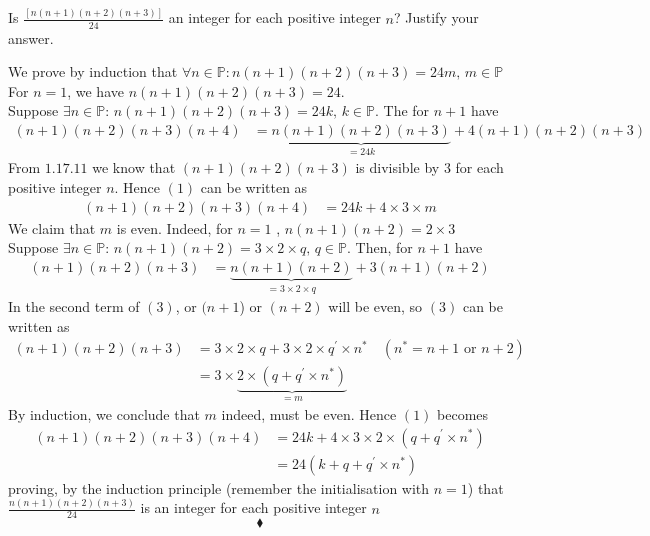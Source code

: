 \subsection{}
\begin{tcolorbox}
 Is $\frac{\left[n(n + 1)(n + 2)(n + 3)\right]}{24}$ an integer for each positive integer $n$? Justify your answer. 
\end{tcolorbox}
$$ $$
We prove  by induction that $\forall n\in \mathbb{P}: n(n + 1)(n + 2)(n + 3)=24m,\, m\in \mathbb{P}$\\
For $n=1$, we have $ n(n + 1)(n + 2)(n + 3) =24$.\\
Suppose $\exists n\in \mathbb{P}:\, n(n+1)(n+2)(n+3)=24k,\, k\in \mathbb{P}$. The for $n+1$  have 
\begin{align}
(n+1)(n+2)(n+3)(n+4)&= \underbrace{n(n+1)(n+2)(n+3)}_{=24k}+4(n+1)(n+2)(n+3)
\end{align}
From $\mathbf{1.17.11}$ we know that  $(n+1)(n+2)(n+3)$ is divisible by $3$ for each positive integer $n$. Hence  $(1)$ can be written as 
\begin{align}
(n+1)(n+2)(n+3)(n+4)&= 24k+4\times 3\times m
\end{align} 
We claim that $m$ is even. Indeed, for $n=1$ , $n(n+1)(n+2)=2\times 3$ \\
Suppose $\exists n\in \mathbb{P}:\, n(n+1)(n+2)=3\times 2\times q,\, q\in \mathbb{P}$. Then, for $n+1$  have 
\begin{align}
(n+1)(n+2)(n+3)&= \underbrace{n(n+1)(n+2)}_{=3\times 2\times q}+3(n+1)(n+2)
\end{align}
In the second term  of $(3)$,  or $(n+1$) or $ (n+2)$ will be even, so $(3)$ can be written as 
\begin{align*}
(n+1)(n+2)(n+3)&= 3\times 2\times q+3\times 2\times q^{'}\times n^*\quad (n^*= n+1\text{ or } n+2)\\
&= 3\times \underbrace{2\times \left(q+q^{'}\times n^*\right)}_{=m}
\end{align*}
By induction, we conclude that $m$ indeed, must be even.
Hence $(1)$ becomes 
\begin{align*}
(n+1)(n+2)(n+3)(n+4)&= 24k+4\times 3\times 2\times \left(q+q^{'}\times n^*\right)\\
&= 24\left(k+q+q^{'}\times n^*\right)
\end{align*}
proving, by the induction principle (remember the initialisation with $n=1$) that $\frac{n(n + 1)(n + 2)(n + 3)}{24}$ is an integer for each positive integer $n$
$$\blacklozenge$$

